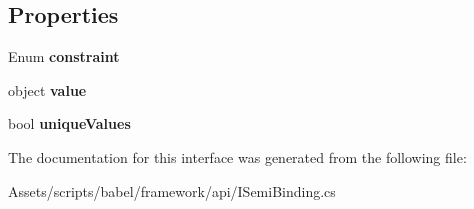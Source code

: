 \subsection*{Properties}
\begin{DoxyCompactItemize}
\item 
\hypertarget{interfacebabel_1_1framework_1_1api_1_1_i_semi_binding_acb119956662a0a2f91ff4d1cfeac7ed8}{Enum {\bfseries constraint}}\label{interfacebabel_1_1framework_1_1api_1_1_i_semi_binding_acb119956662a0a2f91ff4d1cfeac7ed8}

\item 
\hypertarget{interfacebabel_1_1framework_1_1api_1_1_i_semi_binding_adf5ac7f105908f934df508b156ec31f1}{object {\bfseries value}}\label{interfacebabel_1_1framework_1_1api_1_1_i_semi_binding_adf5ac7f105908f934df508b156ec31f1}

\item 
\hypertarget{interfacebabel_1_1framework_1_1api_1_1_i_semi_binding_ac719691a4fe33f1394bff9b01e84e966}{bool {\bfseries unique\-Values}}\label{interfacebabel_1_1framework_1_1api_1_1_i_semi_binding_ac719691a4fe33f1394bff9b01e84e966}

\end{DoxyCompactItemize}


The documentation for this interface was generated from the following file\-:\begin{DoxyCompactItemize}
\item 
Assets/scripts/babel/framework/api/I\-Semi\-Binding.\-cs\end{DoxyCompactItemize}
